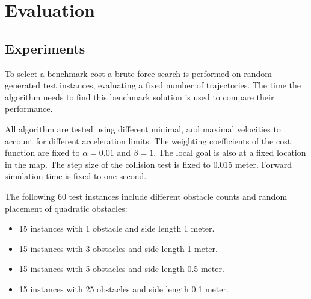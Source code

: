 \chapter{Evaluation}\label{ch:eval}
\section{Experiments}
To select a benchmark cost a brute force search is performed on random generated test instances, evaluating a fixed number of trajectories. 
The time the algorithm needs to find this benchmark solution is used to compare their performance.

All algorithm are tested using different minimal, and maximal velocities to account for different acceleration limits. 
The weighting coefficients of the cost function are fixed to $\alpha=0.01$ and $\beta=1$. The local goal is also at a fixed location in the map. 
The step size of the collision test is fixed to 0.015 meter. 
Forward simulation time is fixed to one second. 

The following 60 test instances include different obstacle counts and random placement of quadratic obstacles:
\begin{itemize}
\item 15 instances with 1 obstacle and side length 1 meter.
\item 15 instances with 3 obstacles and side length 1 meter.
\item 15 instances with 5 obstacles and side length 0.5 meter.
\item 15 instances with 25 obstacles and side length 0.1 meter.
\end{itemize}

